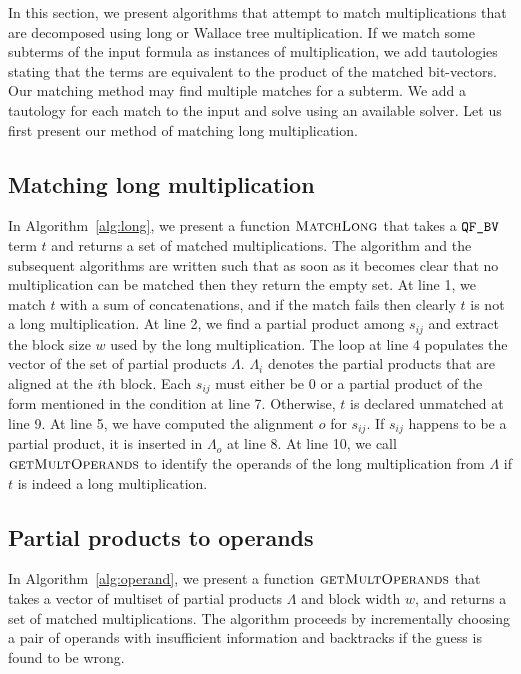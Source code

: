 %
In this section, we %
present algorithms that attempt to match multiplications that are
decomposed using long or Wallace tree multiplication.
%
If we match some subterms of the input formula
as instances of 
multiplication, we add tautologies stating that the terms are 
equivalent to the product of the matched bit-vectors.
%
Our matching method may find multiple matches for a subterm.
%
We add a tautology for each match to the input and solve using
an available solver.
%
Let us first present our method of matching long multiplication. 

\subsection{Matching long multiplication}


In Algorithm~\ref{alg:long}, we present a function $\textsc{MatchLong}$
that takes a $\texttt{QF\_BV}$ term $t$ and returns a set of matched multiplications.
%
The algorithm and the subsequent algorithms are written such that as soon
as it becomes clear that no multiplication can be matched then
they return the empty set. 
%
At line 1, we match $t$ with a sum of concatenations, and if the match fails
then clearly $t$ is not a long multiplication.
%
At line 2, we find a partial product among $s_{ij}$ and extract
the block size $w$ used by the long multiplication.
%
The loop at line $4$ populates the vector of the set of partial products $\Lambda$.
%
$\Lambda_i$ denotes the partial products that are aligned at the $i$th block.
%
Each $s_{ij}$ must either be $0$ or a partial product of the form mentioned in the
condition at line 7.
%
Otherwise, $t$ is declared unmatched at line 9. 
%
At line 5, we have computed the alignment $o$ for $s_{ij}$.
%
If $s_{ij}$ happens to be a partial product, it is inserted in
$\Lambda_o$ at line 8.
%
At line 10, we call $\textsc{getMultOperands}$ to identify the operands
of the long multiplication from $\Lambda$ if $t$ is indeed a long
multiplication.

\subsection{Partial products to operands}


In Algorithm~\ref{alg:operand}, we present a function
$\textsc{getMultOperands}$ that takes a vector of multiset of partial
products $\Lambda$ and block width $w$, and returns a set of matched
multiplications.
%
The algorithm proceeds by incrementally choosing a pair of operands with
insufficient information and backtracks if the guess is found to be
wrong.


